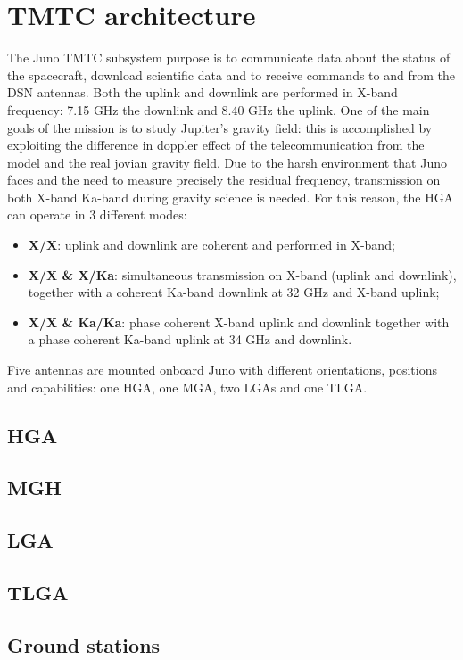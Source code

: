 \section{TMTC architecture}
\label{sec:TMTC_architecture}



The Juno TMTC subsystem purpose is to communicate data about the status of the spacecraft, download scientific data and to receive commands to and from the DSN antennas. Both the uplink and downlink are performed in X-band frequency: 7.15 GHz the downlink and 8.40 GHz the uplink. One of the main goals of the mission is to study Jupiter's gravity field: this is accomplished by exploiting the difference in doppler effect of the telecommunication from the model and the real jovian gravity field. Due to the harsh environment that Juno faces and the need to measure precisely the residual frequency, transmission on both X-band Ka-band during gravity science is needed. 
For this reason, the HGA can operate in 3 different modes: 

\begin{itemize}
\item \textbf{X/X}: uplink and downlink are coherent and performed in X-band;
\end{itemize}

\begin{itemize}
\item \textbf{X/X \& X/Ka}: simultaneous transmission on X-band (uplink and downlink), together with a coherent Ka-band downlink at 32 GHz and X-band uplink;
\item \textbf{X/X \& Ka/Ka}: phase coherent X-band uplink and downlink together with a phase coherent Ka-band uplink at 34 GHz and downlink.
\end{itemize}
Five antennas are mounted onboard Juno with different orientations, positions and capabilities: one HGA, one MGA, two LGAs and one TLGA.

\subsection{HGA}




\subsection{MGH}

\subsection{LGA}

\subsection{TLGA}

\subsection{Ground stations}


